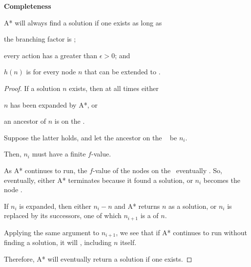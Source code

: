 \begin{listu}
    \item \textbf{Completeness}
    
    \begin{theorem}\label{thm:completeness-of-astar}
        A* will always find a solution if one exists as long as 

        \begin{listu}
            \item the branching factor is ;
            \item every action has a  greater than $\epsilon > 0$; and 
            \item $h(n)$ is  for every node $n$ that can be extended to . 
        \end{listu}
    \end{theorem}

    \begin{proof}
        If a solution $n$ exists, then at all times either 
        \begin{listu}
            \item $n$ has been expanded by A*, or 
            \item an ancestor of $n$ is on the \Frontier.
        \end{listu}

        Suppose the latter holds, and let the ancestor on the \Frontier~ be $n_i$. 

        Then, $n_i$ must have a finite $f$-value. 

        As A* continues to run, the $f$-value of the nodes on the \Frontier~eventually . So, eventually, either A* terminates because it found a solution, or $n_i$ becomes the node .

        If $n_i$ is expanded, then either $n_i - n$ and A* returns $n$ as a solution, or $n_i$ is replaced by its successors, one of which $n_{i+1}$ is a  of $n$.

        Applying the same argument to $n_{i+1}$, we see that if A* continues to run without finding a solution, it will , including $n$ itself. 

        Therefore, A* will eventually return a solution if one exists.
    \end{proof}


\end{listu}
